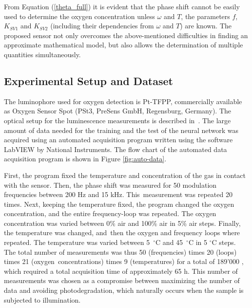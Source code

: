 \documentclass[sensors,article,accept,moreauthors,pdftex,10pt,a4paper]{Definitions/mdpi}
\theoremstyle{definition}
\begin{document}
From Equation (\ref{theta_full}) it is evident that the phase shift cannot be easily used to determine the oxygen concentration unless $\omega$ and $T$, the parameters $f$, $K_{SV1}$ and $K_{SV2}$ (including their dependencies from $\omega$ and $T$) are known.
The proposed sensor not only overcomes the above-mentioned difficulties in finding an approximate mathematical model, but also allows the determination of multiple quantities simultaneously.

\subsection{Experimental Setup and Dataset}
\label{Experimental}

The luminophore used for oxygen detection is Pt-TFPP, commercially available as Oxygen Sensor Spot (PSt3, PreSens  GmbH, Regensburg, %
Germany). The optical setup for the luminescence measurements is described in~\cite{Venturini_2020}. 
The large amount of data needed for the training and the test of the neural network was acquired using an automated acquisition program written using the software LabVIEW by National Instruments. The flow chart of the automated data acquisition program is shown in Figure \ref{fig:auto-data}.



First, the program fixed the temperature and concentration of the gas in contact with the sensor. Then, the phase shift was measured for 50 modulation frequencies between 200 Hz and 15 kHz. This~measurement was repeated 20 times. Next, keeping the temperature fixed, the program changed the oxygen concentration, and the entire frequency-loop was repeated.
The oxygen concentration was varied between 0$\%$ air and 100$\%$ air in 5$\%$ air steps.
Finally, the temperature was changed, and~then the oxygen and frequency loops where repeated. The temperature was varied between 5~$^\circ$C and 45~$^\circ$C in 5 $^\circ$C steps.
The total number of measurements was thus 50 (frequencies) times 20 (loops) times 21 (oxygen~concentrations) times %
 9 (temperatures) for a total of 189'000 %
 , which required a total acquisition time of approximately 65 h. This number of measurements was chosen as a compromise between maximizing the number of data and avoiding photodegradation, which naturally occurs when the sample is subjected to illumination. 
\end{document}
